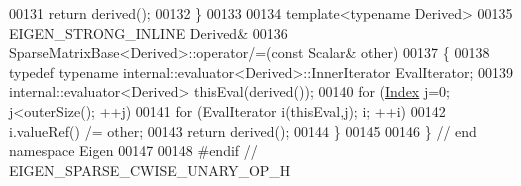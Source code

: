 \begin{DoxyCode}
00131   \textcolor{keywordflow}{return} derived();
00132 \}
00133 
00134 \textcolor{keyword}{template}<\textcolor{keyword}{typename} Derived>
00135 EIGEN\_STRONG\_INLINE Derived&
00136 SparseMatrixBase<Derived>::operator/=(\textcolor{keyword}{const} Scalar& other)
00137 \{
00138   \textcolor{keyword}{typedef} \textcolor{keyword}{typename} internal::evaluator<Derived>::InnerIterator EvalIterator;
00139   internal::evaluator<Derived> thisEval(derived());
00140   \textcolor{keywordflow}{for} (\hyperlink{namespace_eigen_a62e77e0933482dafde8fe197d9a2cfde}{Index} j=0; j<outerSize(); ++j)
00141     \textcolor{keywordflow}{for} (EvalIterator i(thisEval,j); i; ++i)
00142       i.valueRef() /= other;
00143   \textcolor{keywordflow}{return} derived();
00144 \}
00145 
00146 \} \textcolor{comment}{// end namespace Eigen}
00147 
00148 \textcolor{preprocessor}{#endif // EIGEN\_SPARSE\_CWISE\_UNARY\_OP\_H}
\end{DoxyCode}
